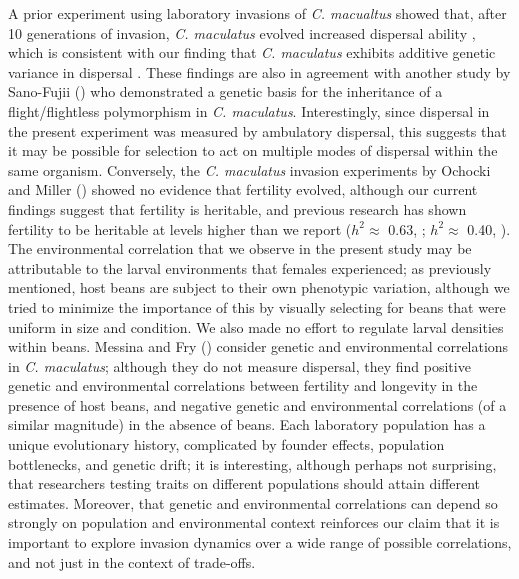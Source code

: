 A prior experiment using laboratory invasions of \textit{C. macualtus} showed that, after 10 generations of invasion, \textit{C. maculatus} evolved increased dispersal ability \citep{ochocki_rapid_2017}, which is consistent with our finding that \textit{C. maculatus} exhibits additive genetic variance in dispersal . These findings are also in agreement with another study by Sano-Fujii (\citeyear{sano-fujii_genetic_1986}) who demonstrated a genetic basis for the inheritance of a flight/flightless polymorphism in \textit{C. maculatus}. Interestingly, since dispersal in the present experiment was measured by ambulatory dispersal, this suggests that it may be possible for selection to act on multiple modes of dispersal within the same organism. Conversely, the \textit{C. maculatus} invasion experiments by Ochocki and Miller (\citeyear{ochocki_rapid_2017}) showed no evidence that fertility evolved, although our current findings suggest that fertility is heritable, and previous research has shown fertility to be heritable at levels higher than we report ($h^{2} \approx$ 0.63, \citep{messina_heritability_1993}; $h^{2} \approx$ 0.40, \citep{messina_environment-dependent_2003}). The environmental correlation that we observe in the present study may be attributable to the larval environments that females experienced; as previously mentioned, host beans are subject to their own phenotypic variation, although we tried to minimize the importance of this by visually selecting for beans that were uniform in size and condition. We also made no effort to regulate larval densities within beans. Messina and Fry (\citeyear{messina_environment-dependent_2003}) consider genetic and environmental correlations in \textit{C. maculatus}; although they do not measure dispersal, they find positive genetic and environmental correlations between fertility and longevity in the presence of host beans, and negative genetic and environmental correlations (of a similar magnitude) in the absence of beans. Each laboratory population has a unique evolutionary history, complicated by founder effects, population bottlenecks, and genetic drift; it is interesting, although perhaps not surprising, that researchers testing traits on different populations should attain different estimates. Moreover, that genetic and environmental correlations can depend so strongly on population and environmental context reinforces our claim that it is important to explore invasion dynamics over a wide range of possible correlations, and not just in the context of trade-offs. 


